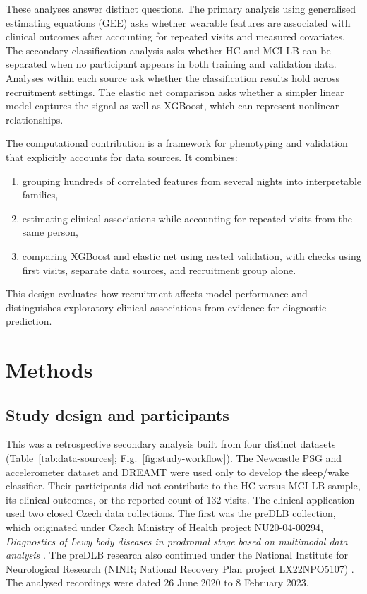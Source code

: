 \documentclass[referee,pdflatex,sn-vancouver-num]{sn-jnl}
\begin{document}
These analyses answer distinct questions. The primary analysis using
generalised estimating equations (GEE) asks whether
wearable features are associated with clinical outcomes after accounting for
repeated visits and measured covariates. The secondary classification analysis
asks whether HC and MCI-LB can be separated when no participant appears in both
training and validation data. Analyses within each source ask whether the
classification results hold across recruitment settings. The elastic net
comparison asks whether a simpler linear model captures the signal as well as
XGBoost, which can represent nonlinear relationships.

The computational contribution is a framework for phenotyping and validation
that explicitly accounts for data sources. It combines:
\begin{enumerate}
  \item grouping hundreds of correlated features from several nights into interpretable families,
  \item estimating clinical associations while accounting for repeated visits from the same person,
  \item comparing XGBoost and elastic net using nested validation, with checks using first visits, separate data sources, and recruitment group alone.
\end{enumerate}
This design evaluates how recruitment affects model performance and distinguishes
exploratory clinical associations from evidence for diagnostic prediction.

\section{Methods}\label{sec:methods}

\subsection{Study design and participants}\label{subsec:participants}

This was a retrospective secondary analysis built from four distinct datasets
(Table~\ref{tab:data-sources}; Fig.~\ref{fig:study-workflow}). The Newcastle PSG and accelerometer dataset and DREAMT
were used only to develop the sleep/wake classifier. Their participants
did not contribute to the HC versus MCI-LB sample, its clinical outcomes, or
the reported count of 132 visits. The clinical application used two closed
Czech data collections. The first was the preDLB collection, which originated
under Czech Ministry of Health
project NU20-04-00294, \textit{Diagnostics of Lewy body diseases in prodromal
stage based on multimodal data analysis} \cite{nu20project}. The preDLB research
also continued under the National Institute for Neurological Research (NINR;
National Recovery Plan project LX22NPO5107) \cite{ninrproject}.
The analysed recordings were dated
26 June 2020 to 8 February 2023.
\end{document}
